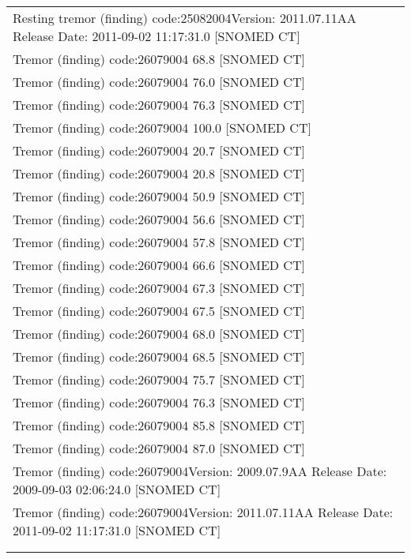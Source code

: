 \documentclass[10pt, letterpaper]{article}
\begin{document}
\begin{spacing}{1.0}
\begin{footnotesize}
\begin{longtable}[H]{l}
        Resting tremor (finding) code:25082004Version: 2011.07.11AA Release Date: 2011-09-02 11:17:31.0 [SNOMED CT]\\
        Tremor (finding) code:26079004  68.8 [SNOMED CT]\\
        Tremor (finding) code:26079004  76.0 [SNOMED CT]\\
        Tremor (finding) code:26079004  76.3 [SNOMED CT]\\
        Tremor (finding) code:26079004 100.0 [SNOMED CT]\\
        Tremor (finding) code:26079004 20.7 [SNOMED CT]\\
        Tremor (finding) code:26079004 20.8 [SNOMED CT]\\
        Tremor (finding) code:26079004 50.9 [SNOMED CT]\\
        Tremor (finding) code:26079004 56.6 [SNOMED CT]\\
        Tremor (finding) code:26079004 57.8 [SNOMED CT]\\
        Tremor (finding) code:26079004 66.6 [SNOMED CT]\\
        Tremor (finding) code:26079004 67.3 [SNOMED CT]\\
        Tremor (finding) code:26079004 67.5 [SNOMED CT]\\
        Tremor (finding) code:26079004 68.0 [SNOMED CT]\\
        Tremor (finding) code:26079004 68.5 [SNOMED CT]\\
        Tremor (finding) code:26079004 75.7 [SNOMED CT]\\
        Tremor (finding) code:26079004 76.3 [SNOMED CT]\\
        Tremor (finding) code:26079004 85.8 [SNOMED CT]\\
        Tremor (finding) code:26079004 87.0 [SNOMED CT]\\
        Tremor (finding) code:26079004Version: 2009.07.9AA Release Date: 2009-09-03 02:06:24.0 [SNOMED CT]\\
        Tremor (finding) code:26079004Version: 2011.07.11AA Release Date: 2011-09-02 11:17:31.0 [SNOMED CT]\\[4pt]
        \hline\\[-6pt]
    \label{tab:desc1}
\end{longtable}
\end{footnotesize}


\end{spacing}
\end{document}
